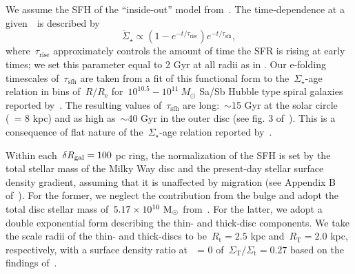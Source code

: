 \par
We assume the SFH of the ``inside-out'' model from~\citet{Johnson2021}.
The time-dependence at a given~\rgal~is described by
\begin{equation}
\dot{\Sigma}_\star \propto (1 - e^{-t / \tau_\text{rise}})
e^{-t/\tau_\text{sfh}},
\end{equation}
where~$\tau_\text{rise}$ approximately controls the amount of time the SFR is
rising at early times; we set this parameter equal to 2 Gyr at all radii as in
\citet{Johnson2021}.
Our e-folding timescales of~$\tau_\text{sfh}$ are taken from a fit of this
functional form to the~$\Sigma_\star$-age relation in bins of~$R / R_\text{e}$
for~$10^{10.5} - 10^{11}~M_\odot$ Sa/Sb Hubble type spiral galaxies reported
by~\citet{Sanchez2020}.
The resulting values of~$\tau_\text{sfh}$ are long:~$\sim$15 Gyr at the solar
circle (\rgal~= 8 kpc) and as high as~$\sim$40 Gyr in the outer disc (see fig.
3 of~\citealp{Johnson2021}).
This is a consequence of flat nature of the~$\Sigma_\star$-age relation
reported by~\citet{Sanchez2020}.
\par
Within each~$\delta R_\text{gal} = 100$ pc ring, the normalization of the SFH is set by
the total stellar mass of the Milky Way disc and the present-day stellar
surface density gradient, assuming that it is unaffected by migration (see
Appendix B of~\citealp{Johnson2021}).
For the former, we neglect the contribution from the bulge and adopt the total
disc stellar mass of~$5.17\times10^{10}~\text{M}_\odot$ from~\citet{Licquia2015}.
For the latter, we adopt a double exponential form describing the thin- and
thick-disc components.
We take the scale radii of the thin- and thick-discs to be~$R_\text{t} = 2.5$
kpc and~$R_\text{T} = 2.0$ kpc, respectively, with a surface density ratio
at~\rgal~= 0 of~$\Sigma_\text{T} / \Sigma_\text{t} = 0.27$ based on the
findings of~\citet{Bland-Hawthorn2016}.

